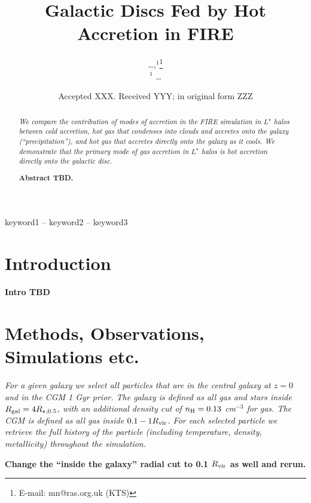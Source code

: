 \documentclass[fleqn,usenatbib]{mnras}
\title[Hot Accretion in FIRE]{Galactic Discs Fed by Hot Accretion in FIRE}
\author[\ldots]{
\ldots,$^{1}$\thanks{E-mail: mn@ras.org.uk (KTS)}
\\
$^1$ \ldots
}
\date{Accepted XXX. Received YYY; in original form ZZZ}
\begin{document}
\label{firstpage}
\pagerange{\pageref{firstpage}--\pageref{lastpage}}
\maketitle

\begin{abstract}
\textit{
We compare the contribution of modes of accretion in the FIRE simulation in $L^\star$ halos between cold accretion, hot gas that condenses into clouds and accretes onto the galaxy (``precipitation''), and hot gas that accretes directly onto the galaxy as it cools.
We demonstrate that the primary mode of gas accretion in $L^\star$ halos is hot accretion directly onto the galactic disc.
}

\textbf{Abstract TBD.}
\end{abstract}

\begin{keywords}
keyword1 -- keyword2 -- keyword3
\end{keywords}



\section{Introduction}

\textbf{Intro TBD}

\section{Methods, Observations, Simulations etc.}



\textit{
For a given galaxy we select all particles that are in the central galaxy at $z=0$ and in the CGM 1 Gyr prior.
The galaxy is defined as all gas and stars inside $R_{\rm gal} = 4 R_{\star,0.5}$, with an additional density cut of $n_{\rm H} = 0.13$ cm$^{-3}$ for gas.
The CGM is defined as all gas inside $0.1 -1 R_{\rm vir}$.
For each selected particle we retrieve the full history of the particle (including temperature, density, metallicity) throughout the simulation.
}

\textbf{Change the ``inside the galaxy'' radial cut to 0.1 $R_{\rm vir}$ as well and rerun.}
\end{document}
